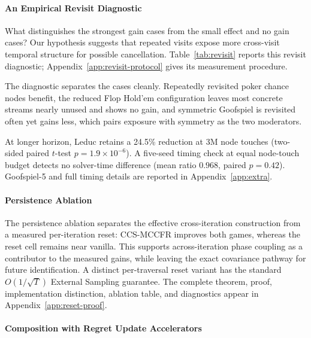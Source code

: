 \documentclass[11pt]{article}
\begin{document}
\paragraph{An Empirical Revisit Diagnostic}
\label{sec:revisit-exp}

What distinguishes the strongest gain cases from the small effect and no gain cases? Our hypothesis suggests that repeated visits expose more cross-visit temporal structure for possible cancellation. Table~\ref{tab:revisit} reports this revisit diagnostic; Appendix~\ref{app:revisit-protocol} gives its measurement procedure.

The diagnostic separates the cases cleanly. Repeatedly revisited poker chance nodes benefit, the reduced Flop Hold'em configuration leaves most concrete streams nearly unused and shows no gain, and symmetric Goofspiel is revisited often yet gains less, which pairs exposure with symmetry as the two moderators.

At longer horizon, Leduc retains a 24.5\% reduction at 3M node touches (two-sided paired $t$-test $p=1.9\!\times\!10^{-6}$). A five-seed timing check at equal node-touch budget detects no solver-time difference (mean ratio $0.968$, paired $p=0.42$). Goofspiel-5 and full timing details are reported in Appendix~\ref{app:extra}.

\paragraph{Persistence Ablation}
\label{sec:persistence}

The persistence ablation separates the effective cross-iteration construction from a measured per-iteration reset: CCS-MCCFR improves both games, whereas the reset cell remains near vanilla. This supports across-iteration phase coupling as a contributor to the measured gains, while leaving the exact covariance pathway for future identification. A distinct per-traversal reset variant has the standard $O(1/\sqrt{T})$ External Sampling guarantee. The complete theorem, proof, implementation distinction, ablation table, and diagnostics appear in Appendix~\ref{app:reset-proof}.

\paragraph{Composition with Regret Update Accelerators}
\label{sec:orthogonality}
\end{document}
